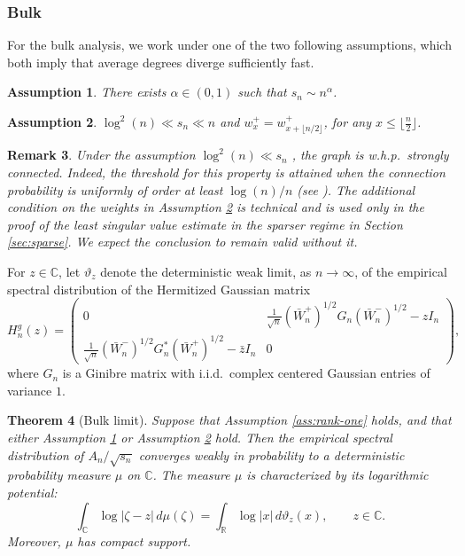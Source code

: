 \documentclass[11pt,oneside]{amsart}
\theoremstyle{plain}
\newtheorem{theorem}{Theorem}[section]
\newtheorem{assumption}[theorem]{Assumption}
\newtheorem{remark}[theorem]{Remark}
\numberwithin{equation}{section}
\newcommand{\whp}{{w.h.p.~}}
\newcommand{\iid}{{i.i.d.~}}
\newcommand{\scaling}{s_n}
\begin{document}
\subsubsection{Bulk}
For the bulk analysis, we work under one of the two following assumptions, which both imply that average degrees diverge sufficiently fast.

\begin{assumption}\label{assumption:bulk-poly} There exists $\alpha \in (0,1)$ such that $\scaling \sim n^\alpha$.
\end{assumption}

\begin{assumption}
\label{assumption:bulk-sparse}
    $\log^2(n) \ll \scaling \ll n$ and $w_{x}^+=w_{x+\lfloor n/2\rfloor }^{+}$, 
    for any $x \le \lfloor \tfrac n 2 \rfloor$.
\end{assumption}
\begin{remark}
Under the assumption $\log^2(n) \ll \scaling$ , the graph is \whp strongly connected. Indeed, the threshold for this property is attained when the connection probability is uniformly of order at least $\log(n)/n$ (see \cite{CF}). The additional condition on the weights in Assumption \ref{assumption:bulk-sparse} is technical and is used only in the proof of the least singular value estimate in the sparser regime in Section \ref{sec:sparse}. We expect the conclusion to remain valid without it.
\end{remark}

For $z\in\mathbb C$, let $\vartheta_z$ denote the deterministic weak limit, as $n\to\infty$, of the empirical spectral distribution of the Hermitized Gaussian matrix
\begin{equation}
\label{eq:her}
H_n^g(z)=
\begin{pmatrix}
0 &
\frac{1}{\sqrt n}(\bar W_n^+)^{1/2}G_n(\bar W_n^-)^{1/2}-zI_n\\
\frac{1}{\sqrt n}(\bar W_n^-)^{1/2}G_n^*(\bar W_n^+)^{1/2}-\bar zI_n
& 0
\end{pmatrix},
\end{equation}
where $G_n$ is a Ginibre matrix with \iid complex centered Gaussian entries of variance $1$.


\begin{theorem}[Bulk limit]
\label{thm:bulk}
Suppose that Assumption \ref{ass:rank-one} holds, and that either Assumption \ref{assumption:bulk-poly} or Assumption \ref{assumption:bulk-sparse} hold. Then the empirical spectral distribution of $A_n/\sqrt{\scaling}$ converges weakly in probability to a deterministic probability measure $\mu$ on $\mathbb C$. The measure $\mu$ is characterized by its logarithmic potential:
\begin{equation}
\int_{\mathbb C}\log|\zeta-z|\,d\mu(\zeta)
=
\int_{\mathbb R}\log|x|\,d\vartheta_z(x),
\qquad z\in\mathbb C.
\end{equation}
Moreover, $\mu$ has compact support.
\end{theorem}
\end{document}
